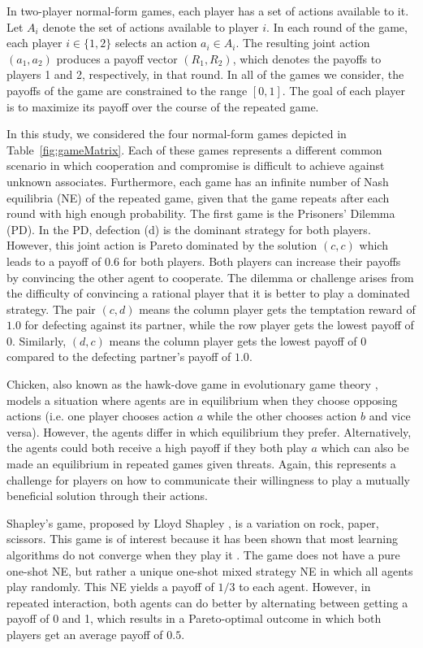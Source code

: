\documentclass[fleqn,10pt]{SelfArx}
\begin{document}
In two-player normal-form games, each player has a set of actions available to it.  Let $A_i$ denote the set of actions available to player $i$.  In each round of the game, each player $i \in \{1,2\}$ selects an action $a_i \in A_{i}$.  The resulting joint action $(a_1,a_2)$ produces a payoff vector $(R_1,R_2)$, which denotes the payoffs to players 1 and 2, respectively, in that round.  In all of the games we consider, the payoffs of the game are constrained to the range $[0,1]$.  The goal of each player is to maximize its payoff over the course of the repeated game.

In this study, we considered the four normal-form games depicted in Table~\ref{fig:gameMatrix}.  Each of these games represents a different common scenario in which cooperation and compromise is difficult to achieve against unknown associates.  Furthermore, each game has an infinite number of Nash equilibria (NE) of the repeated game, given that the game repeats after each round with high enough probability.  The first game is the Prisoners' Dilemma (PD). In the PD, defection (d) is the dominant strategy for both players. However, this joint action is Pareto dominated by the solution $(c,c)$ which leads to a payoff of $0.6$ for both players.  Both players can increase their payoffs by convincing the other agent to cooperate. The dilemma or challenge arises from the difficulty of convincing a rational player that it is better to play a dominated strategy. The pair $(c,d)$ means the column player gets the temptation reward of $1.0$ for defecting against its partner, while the row player gets the lowest payoff of $0$. Similarly, $(d,c)$ means the column player gets the lowest payoff of $0$ compared to the defecting partner's payoff of $1.0$.

Chicken, also known as the hawk-dove game in evolutionary game theory \cite{Smith:etal:1973}, models a situation where agents are in equilibrium when they choose opposing actions (i.e. one player chooses action $a$ while the other chooses action $b$ and vice versa). However, the agents differ in which equilibrium they prefer. Alternatively, the agents could both receive a high payoff if they both play $a$ which can also be made an equilibrium in repeated games given threats. Again, this represents a challenge for players on how to communicate their willingness to play a mutually beneficial solution through their actions.

Shapley's game, proposed by Lloyd Shapley \cite{Shapley:1964}, is a variation on rock, paper, scissors. This game is of interest because it has been shown that most learning algorithms do not converge when they play it \cite{FictitiousPlay}. The game does not have a pure one-shot NE, but rather a unique one-shot mixed strategy NE in which all agents play randomly. This NE yields a payoff of $1/3$ to each agent. However, in repeated interaction, both agents can do better by alternating between getting  a payoff of 0 and 1, which results in a Pareto-optimal outcome in which both players get an average payoff of $0.5$.
\end{document}
